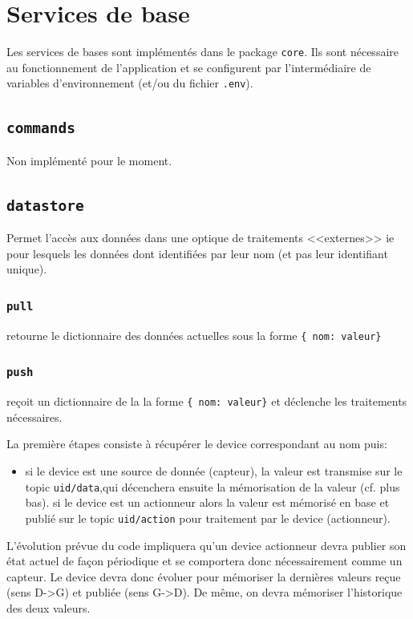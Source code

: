 \chapter{Services de base}

Les services de bases sont implémentés dans le package \lstinline|core|. Ils sont nécessaire au fonctionnement de l'application et se configurent par l'intermédiaire de variables d'environnement (et/ou du fichier \lstinline|.env|).

\section{\lstinline|commands|}

Non implémenté pour le moment.

\section{\lstinline|datastore|}

Permet l'accès aux données dans une optique de traitements <<externes>> ie pour lesquels les données dont identifiées par leur nom (et pas leur identifiant unique).

\subsection{\lstinline|pull|} retourne le dictionnaire des données actuelles sous la forme \lstinline|{ nom: valeur}|

\subsection{\lstinline|push|} reçoit un dictionnaire de la la forme \lstinline|{ nom: valeur}| et déclenche les traitements nécessaires.

La première étapes consiste à récupérer le device correspondant au nom puis:
\begin{itemize}
	\item si le device est une source de donnée (capteur), la valeur est transmise sur le topic \lstinline|uid/data|,qui décenchera ensuite la mémorisation de la valeur (cf. plus bas).
	\ieme si le device est un actionneur alors la valeur est mémorisé en base et publié sur le topic \lstinline|uid/action| pour traitement par le device (actionneur).
\end{itemize}

{\color{red}L'évolution prévue du code impliquera qu'un device actionneur devra publier son état actuel de façon périodique et se comportera donc nécessairement comme un capteur. Le device devra donc évoluer pour mémoriser la dernières valeurs reçue (sens D->G) et publiée (sens G->D). De même, on devra mémoriser l'historique des deux valeurs.}

